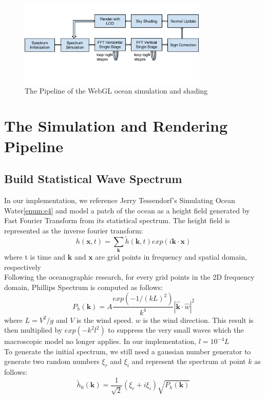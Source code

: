 \documentclass{jcgt}
\begin{document}
\begin{figure}[htb]
  \centering
   \includegraphics[width=0.8\textwidth]{pipeline.png}
   \caption{\label{fig:pipeline}
     The Pipeline of the WebGL ocean simulation and shading}
\end{figure}

\section{The Simulation and Rendering Pipeline}
\subsection{Build Statistical Wave Spectrum}
In our implementation, we reference Jerry Tessendorf's Simulating Ocean Water\ref{enum:e4} and model a patch of the ocean as a height field generated by Fast Fourier Transform from its statistical spectrum. The height field is represented as the inverse fourier transform:
\begin{equation}
h(\mathbf{x},t)=\sum_{\mathbf{k}} \tilde{h} (\mathbf{k},t) exp(i \mathbf{k} \cdot \mathbf{x})
\end{equation}
where t is time and $\mathbf{k}$ and $\mathbf{x}$ are grid points in frequency and spatial domain, respectively\\

Following the oceanographic research, for every grid points in the 2D frequency domain, Phillips Spectrum is computed as follows:
\begin{equation}
P_h (\mathbf{k})=A\frac{exp(-1/(kL)^2)}{k^4}|\hat{\mathbf{k}}\cdot\hat{w}| ^2
\end{equation}
where $L=V^2 /g$ and $V$ is the wind speed. $w$ is the wind direction. This result is then multiplied by $exp(-k^{2} l^{2})$ to suppress the very small waves which the macroscopic model no longer applies. In our implementation, $l=10^{-4}L$ \\

To generate the initial spectrum, we still need a gaussian number generator to generate two random numbers $\xi _r$ and $\xi _i$ and represent the spectrum at point $k$ as follows:
\begin{equation}
\tilde{h}_0 (\mathbf{k})=\frac{1}{\sqrt{2}}(\xi _r +i\xi _i )\sqrt{P_h  (\mathbf{k})}
\end{equation}
\end{document}
